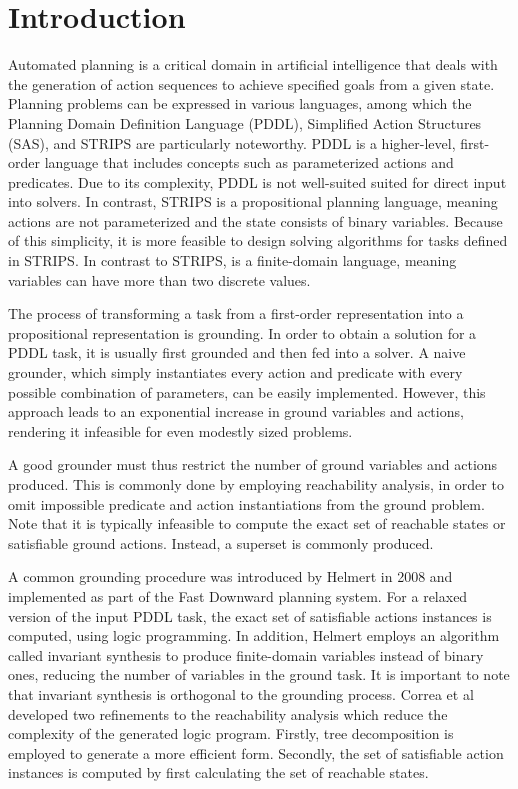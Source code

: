 
\chapter{Introduction}\label{chapter:introduction}

Automated planning is a critical domain in artificial intelligence that deals with the generation of action sequences to achieve specified goals from a given state. Planning problems can be expressed in various languages, among which the Planning Domain Definition Language (PDDL), Simplified Action Structures (SAS), and STRIPS are particularly noteworthy.
PDDL is a higher-level, first-order language that includes concepts such as parameterized actions and predicates.
Due to its complexity, PDDL is not well-suited suited for direct input into solvers.
In contrast, STRIPS is a propositional planning language, meaning actions are not parameterized and the state consists of binary variables. Because of this simplicity, it is more feasible to design solving algorithms for tasks defined in STRIPS.
In contrast to STRIPS, \SASP is a finite-domain language, meaning variables can have more than two discrete values.

The process of transforming a task from a first-order representation into a propositional representation is grounding.
In order to obtain a solution for a PDDL task, it is usually first grounded and then fed into a solver.
A naive grounder, which simply instantiates every action and predicate with every possible combination of parameters, can be easily implemented. However, this approach leads to an exponential increase in ground variables and actions, rendering it infeasible for even modestly sized problems.

A good grounder must thus restrict the number of ground variables and actions produced. This is commonly done by employing reachability analysis, in order to omit impossible predicate and action instantiations from the ground problem. Note that it is typically infeasible to compute the exact set of reachable states or satisfiable ground actions. Instead, a superset is commonly produced.

A common grounding procedure was introduced by Helmert in 2008 and implemented as part of the Fast Downward planning system. For a relaxed version of the input PDDL task, the exact set of satisfiable actions instances is computed, using logic programming. In addition, Helmert employs an algorithm called invariant synthesis to produce finite-domain variables instead of binary ones, reducing the number of variables in the ground task. It is important to note that invariant synthesis is orthogonal to the grounding process.
Correa et al developed two refinements to the reachability analysis which reduce the complexity of the generated logic program. Firstly, tree decomposition is employed to generate a more efficient form. Secondly, the set of satisfiable action instances is computed by first calculating the set of reachable states.

